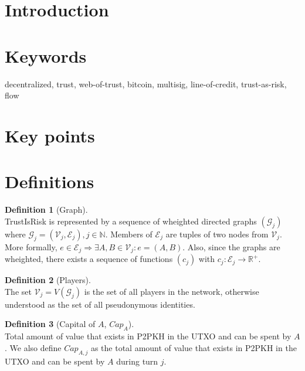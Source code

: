\documentclass[11pt]{article}
\theoremstyle{definition}
\newtheorem{definition}{Definition}[section]
\theoremstyle{corollary}
\theoremstyle{lemma}
\begin{document}
  \section{Introduction}

  \section{Keywords}
      decentralized, trust, web-of-trust, bitcoin, multisig, line-of-credit, trust-as-risk, flow  

  \section{Key points}

  \section{Definitions}
      \begin{definition}[Graph] \ \\
         TrustIsRisk is represented by a sequence of wheighted directed graphs $(\mathcal{G}_j)$ where $\mathcal{G}_j =
         (\mathcal{V}_j, \mathcal{E}_j), j \in \mathbb{N}$. Members of $\mathcal{E}_j$ are tuples of two nodes from
         $\mathcal{V}_j$. More formally, $e \in \mathcal{E}_j \Rightarrow \exists A,B \in \mathcal{V}_j : e = (A,B)$.
         Also, since the graphs are wheighted, there exists a sequence of functions $(c_j)$ with $c_j : \mathcal{E}_j
         \rightarrow \mathbb{R}^{+}$.
      \end{definition}
      \begin{definition}[Players] \ \\
         The set $\mathcal{V}_j = V(\mathcal{G}_j)$ is the set of all players in the network, otherwise understood as the
         set of all pseudonymous identities.
      \end{definition}
      \begin{definition}[Capital of $A$, $Cap_A$] \ \\
        Total amount of value that exists in P2PKH in the UTXO and can be spent by $A$. We also define $Cap_{A,j}$ as
        the total amount of value that exists in P2PKH in the UTXO and can be spent by $A$ during turn $j$.
      \end{definition}
\end{document}
